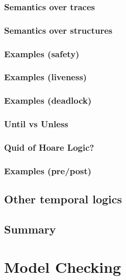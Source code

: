 \documentclass[12pt, a4paper]{book}
\begin{document}
  \subsubsection{Semantics over traces}
  \label{subs:Semantics over traces}
  \subsubsection{Semantics over structures}
  \label{subs:Semantics over structures}
  \subsubsection{Examples (safety)}
  \label{subs:Examples (safety)}
  \subsubsection{Examples (liveness)}
  \label{subs:Examples (liveness)}
  \subsubsection{Examples (deadlock)}
  \label{subs:Examples (deadlock)}
  \subsubsection{Until vs Unless}
  \label{subs:Until vs Unless}
  \subsubsection{Quid of Hoare Logic?}
  \label{subs:Quid of Hoare Logic?}
  \subsubsection{Examples (pre/post)}
  \label{subs:Examples (pre/post)}
  \subsection{Other temporal logics}
  \label{sub:Other temporal logics}
  \subsection{Summary}
  \label{sub:Summary}






  \section{Model Checking}
  \label{sec:Model Checking}
\end{document}
